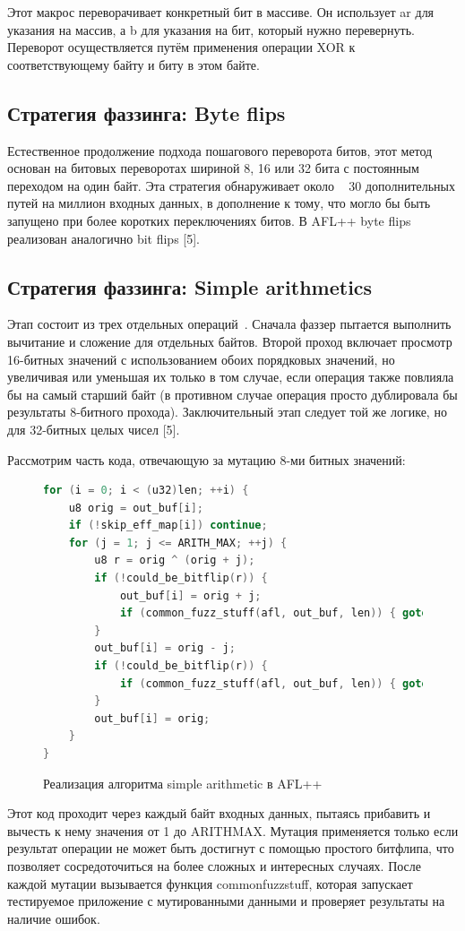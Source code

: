 Этот макрос переворачивает конкретный бит в массиве. Он использует \textunderscore ar для указания на массив, а \textunderscore b для указания на бит, который нужно перевернуть. Переворот осуществляется путём применения операции XOR к соответствующему байту и биту в этом байте.

\subsection{Стратегия фаззинга: Byte flips} \label{ch2:byte-flips}
Естественное продолжение подхода пошагового переворота битов, этот метод основан на битовых переворотах шириной 8, 16 или 32 бита с постоянным переходом на один байт. Эта стратегия обнаруживает около ~ 30 дополнительных путей на миллион входных данных, в дополнение к тому, что могло бы быть запущено при более коротких переключениях битов. В AFL++ byte flips реализован аналогично bit flips [5].

\subsection{Стратегия фаззинга: Simple arithmetics} \label{ch2:simple-arithmetics}
Этап состоит из трех отдельных операций~\cite{???}. Сначала фаззер пытается выполнить вычитание и сложение для отдельных байтов. Второй проход включает просмотр 16-битных значений с использованием обоих порядковых значений, но увеличивая или уменьшая их только в том случае, если операция также повлияла бы на самый старший байт (в противном случае операция просто дублировала бы результаты 8-битного прохода). Заключительный этап следует той же логике, но для 32-битных целых чисел [5].

Рассмотрим часть кода, отвечающую за мутацию 8-ми битных значений:

\begin{figure}[ht]
	\begin{lstlisting}[language=C]
	for (i = 0; i < (u32)len; ++i) {
	u8 orig = out_buf[i];
	if (!skip_eff_map[i]) continue;
	for (j = 1; j <= ARITH_MAX; ++j) {
		u8 r = orig ^ (orig + j);
		if (!could_be_bitflip(r)) {
			out_buf[i] = orig + j;
			if (common_fuzz_stuff(afl, out_buf, len)) { goto abandon_entry; }
		}
		out_buf[i] = orig - j;
		if (!could_be_bitflip(r)) {
			if (common_fuzz_stuff(afl, out_buf, len)) { goto abandon_entry; }
		}
		out_buf[i] = orig;
	}
}
	\end{lstlisting}
	\caption{Реализация алгоритма simple arithmetic в AFL++~\cite{???}}\label{fig:simple-arithmetic}
\end{figure}
\newpage
Этот код проходит через каждый байт входных данных, пытаясь прибавить и вычесть к нему значения от 1 до ARITH\textunderscore MAX. Мутация применяется только если результат операции не может быть достигнут с помощью простого битфлипа, что позволяет сосредоточиться на более сложных и интересных случаях. После каждой мутации вызывается функция common\textunderscore fuzz\textunderscore stuff, которая запускает тестируемое приложение с мутированными данными и проверяет результаты на наличие ошибок.


